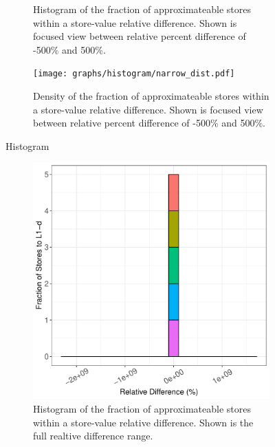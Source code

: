 \begin{figure}[htbp]
\begin{subfigure}{0.33\textwidth}
		\caption{Histogram of the fraction of approximateable stores within a store-value relative difference. Shown is focused view between relative percent difference of -500\% and 500\%.}
	\end{subfigure}
	\begin{subfigure}{0.33\textwidth}
		\centering
		\texttt{[image: graphs/histogram/narrow\_dist.pdf]}
		\caption{Density of the fraction of approximateable stores within a store-value relative difference. Shown is focused view between relative percent difference of -500\% and 500\%.}
	\end{subfigure}

\caption{Histogram}
\label{fig:histogram_valsim}%
\end{figure}

\begin{figure}[htbp]
	\begin{subfigure}{0.33\textwidth}
		\centering
		\includegraphics[scale=0.4]{graphs/histogram_top5/full_hist.pdf}
		\caption{Histogram of the fraction of approximateable stores within a store-value relative difference. Shown is the full realtive difference range.}
	\end{subfigure}
	\begin{subfigure}{0.33\textwidth}
		\centering

\end{subfigure}
\end{figure}
